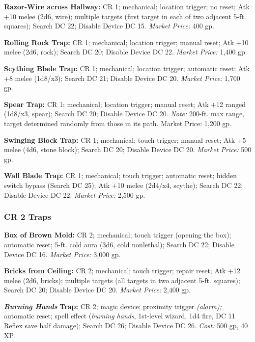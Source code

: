 \documentclass{article}
\begin{document}
\textbf{Razor-Wire across Hallway:} CR 1; mechanical; location trigger; no reset; 
Atk +10 melee (2d6, wire); multiple targets (first target in each of two adjacent 
5-ft. squares); Search DC 22; Disable Device DC 15. \textit{Market Price: }400 
gp.

\textbf{Rolling Rock Trap: }CR 1; mechanical; location trigger; manual reset; Atk 
+10 melee (2d6, rock); Search DC 20; Disable Device DC 22. \textit{Market Price: 
}1,400 gp.

\textbf{Scything Blade Trap:} CR 1; mechanical; location trigger; automatic reset; 
Atk +8 melee (1d8/x3); Search DC 21; Disable Device DC 20. \textit{Market Price: 
}1,700 gp.

\textbf{Spear Trap: }CR 1; mechanical; location trigger; manual reset; Atk +12 
ranged (1d8/x3, spear); Search DC 20; Disable Device DC 20. \textit{Note: }200-ft. 
max range, target determined randomly from those in its path. Market Price: 1,200 
gp.

\textbf{Swinging Block Trap:} CR 1; mechanical; touch trigger; manual reset; Atk 
+5 melee (4d6, stone block); Search DC 20; Disable Device DC 20. \textit{Market 
Price: }500 gp.

\textbf{Wall Blade Trap: }CR 1; mechanical; touch trigger; automatic reset; hidden 
switch bypass (Search DC 25); Atk +10 melee (2d4/x4, scythe); Search DC 22; Disable 
Device DC 22. \textit{Market Price: }2,500 gp.

\vspace{12pt}
\subsubsection*{\textbf{CR 2 Traps}}

\textbf{Box of Brown Mold:} CR 2; mechanical; touch trigger (opening the box); 
automatic reset; 5-ft. cold aura (3d6, cold nonlethal); Search DC 22; Disable Device 
DC 16. \textit{Market Price: }3,000 gp.

\textbf{Bricks from Ceiling:} CR 2; mechanical; touch trigger; repair reset; Atk 
+12 melee (2d6, bricks); multiple targets (all targets in two adjacent 5-ft. squares); 
Search DC 20; Disable Device DC 20. \textit{Market Price: }2,400 gp.

\textit{\textbf{Burning Hands }}\textbf{Trap:} CR 2; magic device; proximity trigger 
\textit{(alarm); }automatic reset; spell effect (\textit{burning hands}, 1st-level 
wizard, 1d4 fire, DC 11 Reflex save half damage); Search DC 26; Disable Device 
DC 26. \textit{Cost: }500 gp, 40 XP.
\end{document}
